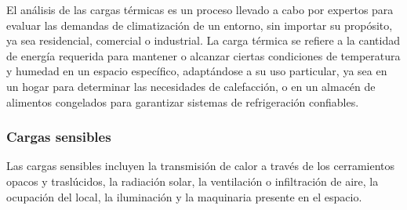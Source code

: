 El análisis de las cargas térmicas es un proceso llevado a cabo por expertos para evaluar las demandas de climatización de un entorno, sin importar su propósito, ya sea residencial, comercial o industrial.
La carga térmica se refiere a la cantidad de energía requerida para mantener o alcanzar ciertas condiciones de temperatura y humedad en un espacio específico, adaptándose a su uso particular, ya sea en un hogar para determinar las necesidades de calefacción, o en un almacén de alimentos congelados para garantizar sistemas de refrigeración confiables. \cite{sampp-2023}
\subsubsection{Cargas sensibles}
Las cargas sensibles incluyen la transmisión de calor a través de los cerramientos
opacos y traslúcidos, la radiación solar, la ventilación o infiltración de aire, la
ocupación del local, la iluminación y la maquinaria presente en el espacio.

